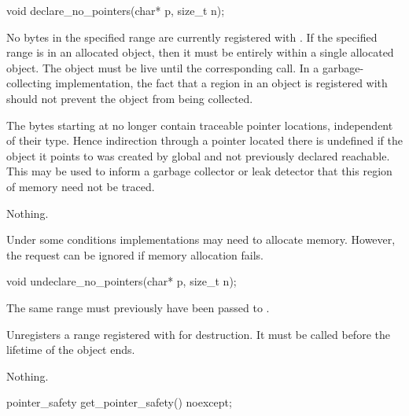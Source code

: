 %
\begin{itemdecl}
void declare_no_pointers(char* p, size_t n);
\end{itemdecl}

\begin{itemdescr}
\pnum
\requires No bytes in the specified range
are currently registered with
. If the specified range is in an allocated object,
then it must be entirely within a single allocated object. The object must be
live until the corresponding  call. \enternote In
a garbage-collecting implementation, the fact that a region in an object is
registered with  should not prevent the object from
being collected. \exitnote

\pnum
\effects The  bytes starting at  no longer contain
traceable pointer locations, independent of their type. Hence
indirection through a pointer located there is undefined if the object
it points to was created by global  and not
previously declared reachable. \enternote This may be used to inform a
garbage collector or leak detector that this region of memory need not
be traced. \exitnote

\pnum
\throws Nothing.

\pnum
\enternote Under some conditions implementations may need to allocate memory.
However, the request can be ignored if memory allocation fails. \exitnote
\end{itemdescr}

%
\begin{itemdecl}
void undeclare_no_pointers(char* p, size_t n);
\end{itemdecl}

\begin{itemdescr}
\pnum
\requires The same range must previously have been passed to
.

\pnum
\effects Unregisters a range registered with  for
destruction. It must be called before the lifetime of the object ends.

\pnum
\throws Nothing.
\end{itemdescr}

%
\begin{itemdecl}
pointer_safety get_pointer_safety() noexcept;
\end{itemdecl}

